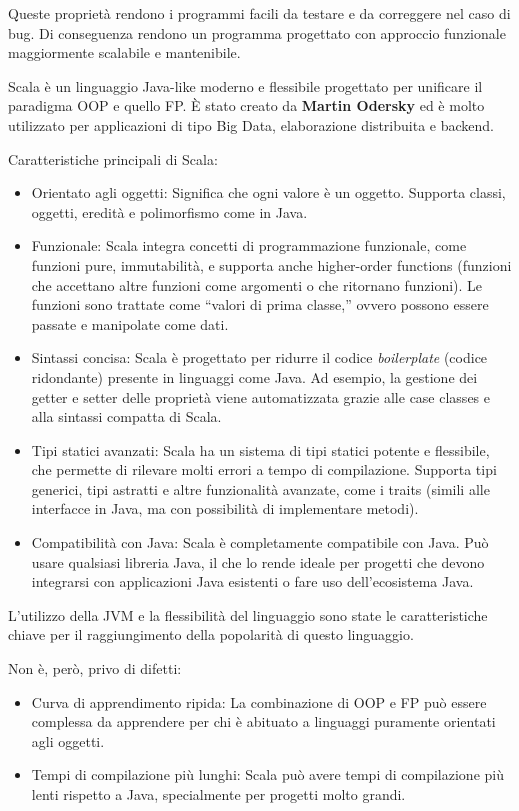 \documentclass[12pt,a4paper,openright,twoside]{book}
\begin{document}
Queste proprietà rendono i programmi facili da testare e da correggere nel caso di bug. Di conseguenza rendono un programma progettato con approccio funzionale maggiormente scalabile e mantenibile.

Scala è un linguaggio Java-like moderno e flessibile progettato per unificare il paradigma \ac{OOP} e quello \ac{FP}.  È stato creato da \textbf{Martin Odersky} ed è molto utilizzato per applicazioni di tipo Big Data, elaborazione distribuita e backend.

Caratteristiche principali di Scala:
\begin{itemize}
    \item Orientato agli oggetti: Significa che ogni valore è un oggetto. Supporta classi, oggetti, eredità e polimorfismo come in Java.
    \item Funzionale: Scala integra concetti di programmazione funzionale, come funzioni pure, immutabilità, e supporta anche higher-order functions (funzioni che accettano altre funzioni come argomenti o che ritornano funzioni). Le funzioni sono trattate come “valori di prima classe,” ovvero possono essere passate e manipolate come dati.
    \item Sintassi concisa: Scala è progettato per ridurre il codice \textit{boilerplate} (codice ridondante) presente in linguaggi come Java. Ad esempio, la gestione dei getter e setter delle proprietà viene automatizzata grazie alle case classes e alla sintassi compatta di Scala.
    \item Tipi statici avanzati: Scala ha un sistema di tipi statici potente e flessibile, che permette di rilevare molti errori a tempo di compilazione. Supporta tipi generici, tipi astratti e altre funzionalità avanzate, come i traits (simili alle interfacce in Java, ma con possibilità di implementare metodi).
    \item Compatibilità con Java: Scala è completamente compatibile con Java. Può usare qualsiasi libreria Java, il che lo rende ideale per progetti che devono integrarsi con applicazioni Java esistenti o fare uso dell'ecosistema Java.
\end{itemize}

L'utilizzo della \ac{JVM} e la flessibilità del linguaggio sono state le caratteristiche chiave per il raggiungimento della popolarità di questo linguaggio.

Non è, però, privo di difetti:

\begin{itemize}
    \item Curva di apprendimento ripida: La combinazione di OOP e FP può essere complessa da apprendere per chi è abituato a linguaggi puramente orientati agli oggetti.
    \item Tempi di compilazione più lunghi: Scala può avere tempi di compilazione più lenti rispetto a Java, specialmente per progetti molto grandi.
\end{itemize}
\end{document}
